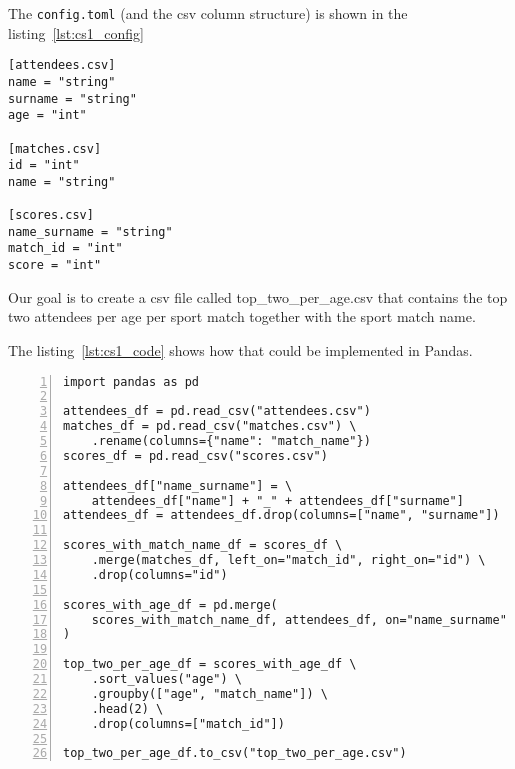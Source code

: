 The \verb|config.toml| (and the csv column structure) is shown in the listing~\ref{lst:cs1_config}

\begin{lstlisting}[caption=config.toml of the first case study, label={lst:cs1_config}, captionpos=b]
[attendees.csv]
name = "string"
surname = "string"
age = "int"

[matches.csv]
id = "int"
name = "string"

[scores.csv]
name_surname = "string"
match_id = "int"
score = "int"
\end{lstlisting}

Our goal is to create a csv file called top\_two\_per\_age.csv that contains the top two attendees per age per sport match
together with the sport match name.

The listing~\ref{lst:cs1_code} shows how that could be implemented in Pandas.

\begin{lstlisting}[caption=Solution of the first case study in Pandas, label={lst:cs1_code}, captionpos=b, numbers=left]
import pandas as pd

attendees_df = pd.read_csv("attendees.csv")
matches_df = pd.read_csv("matches.csv") \
    .rename(columns={"name": "match_name"})
scores_df = pd.read_csv("scores.csv")

attendees_df["name_surname"] = \
    attendees_df["name"] + "_" + attendees_df["surname"]
attendees_df = attendees_df.drop(columns=["name", "surname"])

scores_with_match_name_df = scores_df \
    .merge(matches_df, left_on="match_id", right_on="id") \
    .drop(columns="id")

scores_with_age_df = pd.merge(
    scores_with_match_name_df, attendees_df, on="name_surname"
)

top_two_per_age_df = scores_with_age_df \
    .sort_values("age") \
    .groupby(["age", "match_name"]) \
    .head(2) \
    .drop(columns=["match_id"])

top_two_per_age_df.to_csv("top_two_per_age.csv")
\end{lstlisting}

